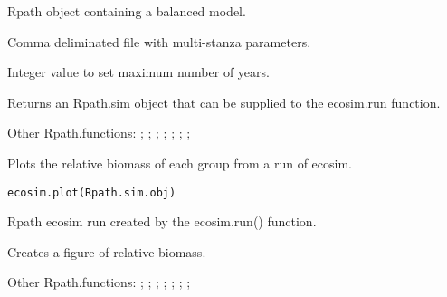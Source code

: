 \documentclass[a4paper]{book}
\begin{document}
%
\begin{Arguments}
\begin{ldescription}
\item[\code{Rpath}] Rpath object containing a balanced model.

\item[\code{juvfile}] Comma deliminated file with multi-stanza parameters.

\item[\code{YEARS}] Integer value to set maximum number of years.
\end{ldescription}
\end{Arguments}
%
\begin{Value}
Returns an Rpath.sim object that can be supplied to the ecosim.run function.
\end{Value}
%
\begin{SeeAlso}\relax
Other Rpath.functions: ;
; ;
; ;
; ;
\end{SeeAlso}
%
\begin{Description}\relax
Plots the relative biomass of each group from a run of ecosim.
\end{Description}
%
\begin{Usage}
\begin{verbatim}
ecosim.plot(Rpath.sim.obj)
\end{verbatim}
\end{Usage}
%
\begin{Arguments}
\begin{ldescription}
\item[\code{Rpath.sim.obj}] Rpath ecosim run created by the ecosim.run() function.
\end{ldescription}
\end{Arguments}
%
\begin{Value}
Creates a figure of relative biomass.
\end{Value}
%
\begin{SeeAlso}\relax
Other Rpath.functions: ;
; ;
; ;
; ;
\end{SeeAlso}
\end{document}
